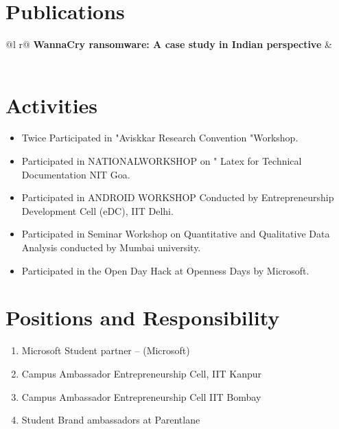 \documentclass[a4paper,12pt]{article}
\begin{document}
\section{Publications}
\begin{tabularx}{\linewidth}{ @{}l r@{} }
\textbf{WannaCry ransomware: A case study in Indian perspective} &  \\[3.75pt]
  \\
\end{tabularx}

\section{Activities}
\begin{itemize}
    \item[\ding{51}]Twice Participated in "Aviskkar Research
    Convention "Workshop.
    \item[\ding{51}]Participated in NATIONALWORKSHOP on " Latex for 
    Technical Documentation NIT Goa.
    \item[\ding{51}] Participated in ANDROID WORKSHOP
    Conducted by Entrepreneurship Development Cell (eDC), IIT Delhi.
    \item[\ding{51}] Participated in Seminar Workshop on Quantitative 
    and Qualitative Data Analysis conducted by Mumbai university.
    \item[\ding{51}] Participated in the Open Day Hack at Openness 
    Days by Microsoft.
\end{itemize}
\section{Positions and Responsibility}
\begin{enumerate}
    \item Microsoft Student partner – (Microsoft)
    \item Campus Ambassador Entrepreneurship Cell, IIT Kanpur
    \item Campus Ambassador Entrepreneurship Cell IIT Bombay
    \item Student Brand ambassadors at Parentlane
\end{enumerate}
\end{document}
